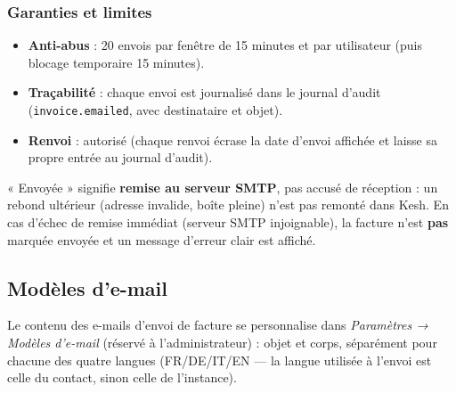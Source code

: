 \documentclass[a4paper,11pt,oneside]{article}
\begin{document}
\subsubsection{Garanties et limites}

\begin{itemize}
    \item \textbf{Anti-abus} : 20 envois par fen\^etre de 15 minutes et par
          utilisateur (puis blocage temporaire 15 minutes).
    \item \textbf{Tra\c{c}abilit\'e} : chaque envoi est journalis\'e dans
          le journal d'audit (\texttt{invoice.emailed}, avec destinataire et objet).
    \item \textbf{Renvoi} : autoris\'e (chaque renvoi \'ecrase la date
          d'envoi affich\'ee et laisse sa propre entrée au journal d'audit).
\end{itemize}

\begin{keshnote}
« Envoyée » signifie \textbf{remise au serveur SMTP}, pas accus\'e
de r\'eception : un rebond ult\'erieur (adresse invalide, bo\^ite pleine)
n'est pas remont\'e dans Kesh. En cas d'\'echec de remise imm\'ediat
(serveur SMTP injoignable), la facture n'est \textbf{pas} marqu\'ee
envoy\'ee et un message d'erreur clair est affich\'e.
\end{keshnote}

\subsection{Mod\`eles d'e-mail}\label{sec:email-templates-admin}

Le contenu des e-mails d'envoi de facture se personnalise dans
\emph{Param\`etres → Mod\`eles d'e-mail} (r\'eserv\'e \`a
l'administrateur) : objet et corps, s\'epar\'ement pour chacune des quatre
langues (FR/DE/IT/EN — la langue utilis\'ee \`a l'envoi est celle du
contact, sinon celle de l'instance).
\end{document}
